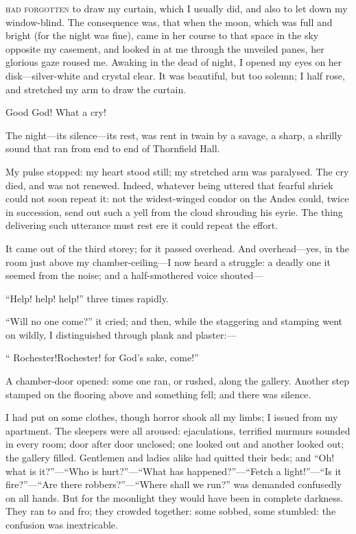 
 \textsc{had forgotten} to draw my curtain, which I usually did, and also to let
down my window-blind. The consequence was, that when the moon, which
was full and bright (for the night was fine), came in her course to that
space in the sky opposite my casement, and looked in at me through the
unveiled panes, her glorious gaze roused me. Awaking in the dead of
night, I opened my eyes on her disk---silver-white and crystal clear.
It was beautiful, but too solemn; I half rose, and stretched my arm to
draw the curtain.

Good God! What a cry!

The night---its silence---its rest, was rent in twain by a savage, a
sharp, a shrilly sound that ran from end to end of Thornfield Hall.

My pulse stopped: my heart stood still; my stretched arm was paralysed.
The cry died, and was not renewed. Indeed, whatever being uttered that
fearful shriek could not soon repeat it: not the widest-winged condor on
the Andes could, twice in succession, send out such a yell from the
cloud shrouding his eyrie. The thing delivering such utterance must
rest ere it could repeat the effort.

It came out of the third storey; for it passed overhead. And
overhead---yes, in the room just above my chamber-ceiling---I now heard
a struggle: a deadly one it seemed from the noise; and a half-smothered
voice shouted---

\enquote{Help! help! help!} three times rapidly.

\enquote{Will no one come?} it cried; and then, while the staggering and
stamping went on wildly, I distinguished through plank and plaster:---

\enquote{ Rochester!Rochester! for God's sake, come!}

A chamber-door opened: some one ran, or rushed, along the gallery.
Another step stamped on the flooring above and something fell; and there
was silence.

I had put on some clothes, though horror shook all my limbs; I issued
from my apartment. The sleepers were all aroused: ejaculations,
terrified murmurs sounded in every room; door after door unclosed; one
looked out and another looked out; the gallery filled. Gentlemen and
ladies alike had quitted their beds; and \enquote{Oh! what is
	it?}---\enquote{Who is hurt?}---\enquote{What has
	happened?}---\enquote{Fetch a light!}---\enquote{Is it
	fire?}---\enquote{Are there robbers?}---\enquote{Where shall we run?}
was demanded confusedly on all hands. But for the moonlight they would
have been in complete darkness. They ran to and fro; they crowded
together: some sobbed, some stumbled: the confusion was inextricable.


